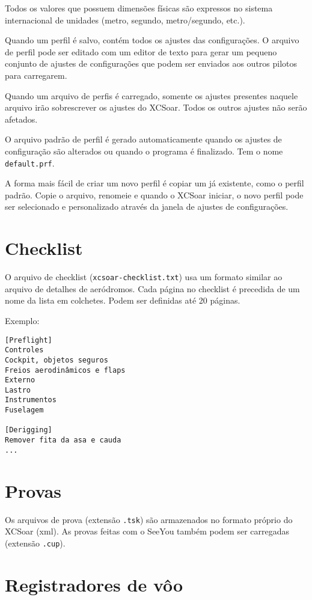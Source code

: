 Todos os valores que possuem dimensões físicas são expressos no sistema internacional de unidades (metro, segundo, metro/segundo, etc.).

Quando um perfil é salvo, contém todos os ajustes das configurações.  O arquivo de perfil pode ser editado com um editor de texto para gerar um pequeno conjunto de ajustes de configurações que podem ser enviados aos outros pilotos para carregarem.

Quando um arquivo de perfis é carregado, somente os ajustes presentes naquele arquivo irão sobrescrever os ajustes do XCSoar.  Todos os outros ajustes não serão afetados.

O arquivo padrão de perfil é gerado automaticamente quando os ajustes de configuração são alterados ou quando o programa é finalizado.  Tem o nome \verb|default.prf|.

A forma mais fácil de criar um novo perfil é copiar um já existente, como o perfil padrão.  Copie o arquivo, renomeie e quando o XCSoar iniciar, o novo perfil pode ser selecionado e personalizado através da janela de ajustes de configurações. 


\section{Checklist}\label{sec:checklist-file}

O arquivo de checklist (\verb|xcsoar-checklist.txt|) usa um formato similar ao arquivo de detalhes de aeródromos.  Cada página no checklist é precedida de um nome da lista em colchetes.  Podem ser definidas até 20 páginas.

Exemplo:

\begin{verbatim}
[Preflight]
Controles
Cockpit, objetos seguros
Freios aerodinâmicos e flaps
Externo
Lastro
Instrumentos
Fuselagem

[Derigging]
Remover fita da asa e cauda
...
\end{verbatim}

\section{Provas}

Os arquivos de prova (extensão \verb|.tsk|) são armazenados no formato próprio do XCSoar (xml).  As provas feitas com o SeeYou também podem ser carregadas (extensão \verb|.cup|).

\section{Registradores de vôo} \label{sec:logfiles}

